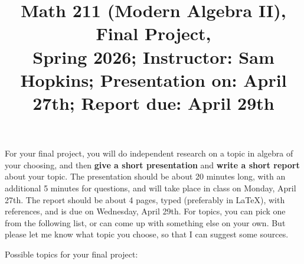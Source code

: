 \documentclass[11pt]{article}
\title{Math 211 (Modern Algebra II), Final Project, \\ {\normalsize Spring 2026; Instructor: Sam Hopkins; Presentation on: April 27th; Report due: April 29th}}
\date{}
\begin{document}
\maketitle

\thispagestyle{empty}

\vspace{-1.5cm}

For your final project, you will do independent research on a topic in algebra of your choosing, and then {\bf give a short presentation} and {\bf write a short report} about your topic. The presentation should be about 20 minutes long, with an additional 5 minutes for questions, and will take place in class on Monday, April 27th. The report should be about 4 pages, typed (preferably in LaTeX), with references, and is due on Wednesday, April 29th. For topics, you can pick one from the following list, or can come up with something else on your own. But please let me know what topic you choose, so that I can suggest some sources.

Possible topics for your final project:

\vspace{-0.2cm}
\end{document}
